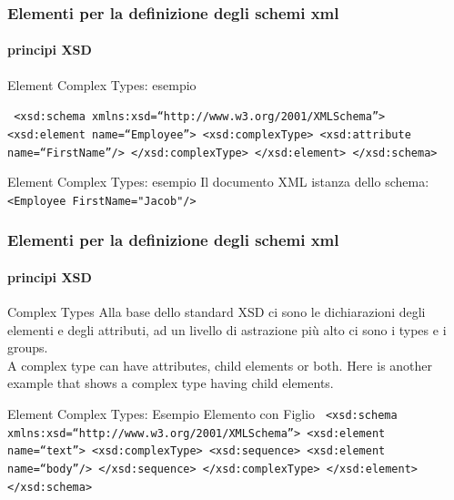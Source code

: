 \begin{frame}
	\frametitle{Elementi per la definizione degli schemi xml}
	\framesubtitle{principi XSD}
	\addtocounter{nframe}{1}

	\begin{block}{Element Complex Types: esempio}

		\texttt{
			<xsd:schema xmlns:xsd=``http://www.w3.org/2001/XMLSchema''>
			<xsd:element name=``Employee''>
			<xsd:complexType>
			<xsd:attribute name=``FirstName''/>
			</xsd:complexType>
			</xsd:element>
			</xsd:schema>
		}
	\end{block}

	\begin{block}{Element Complex Types: esempio}
		Il documento XML istanza dello schema:
		\\\texttt{<Employee FirstName="Jacob"/>}
	\end{block}

\end{frame}

\begin{frame}
	\frametitle{Elementi per la definizione degli schemi xml}
	\framesubtitle{principi XSD}
	\addtocounter{nframe}{1}

	\begin{block}{Complex Types}
		Alla base dello standard XSD ci sono le dichiarazioni degli elementi e degli attributi, ad un livello di astrazione più alto ci sono i types e i groups.
		\\ A complex type can have attributes, child elements or both. Here is another example that shows a complex type having child elements.

	\end{block}

	\begin{block}{Element Complex Types: Esempio Elemento con Figlio}
		\texttt{
			<xsd:schema xmlns:xsd=``http://www.w3.org/2001/XMLSchema''>
			<xsd:element name=``text''>
			<xsd:complexType>
			<xsd:sequence>
			<xsd:element name=``body''/>
			</xsd:sequence>
			</xsd:complexType>
			</xsd:element>
			</xsd:schema>}
	\end{block}

\end{frame}

